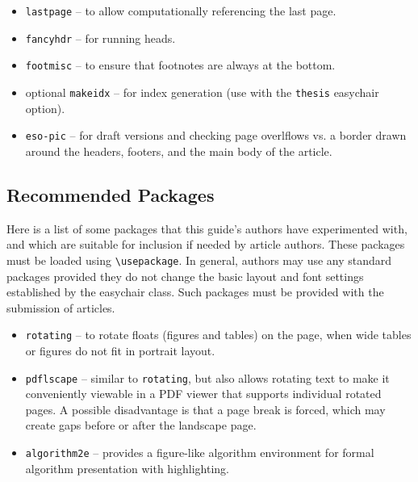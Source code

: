 \documentclass[EPiC]{easychair}
\newcommand{\easychair}{\textsf{easychair}}
\begin{document}
\begin{itemize}
\item
\texttt{lastpage} \cite{lastpage-package} -- to allow computationally
referencing the last page.

\item
\texttt{fancyhdr} \cite{fancyhdr-package} -- for running heads.

\item
\texttt{footmisc} \cite{footmisc-package} -- to ensure that footnotes are
always at the bottom.

\item
optional \texttt{makeidx} \cite{makeidx-package} -- for index generation
(use with the \texttt{thesis} {\easychair} option).

\item
\texttt{eso-pic} \cite{eso-pic-package} -- for draft versions and checking page
overlflows vs. a border drawn around the headers, footers, and the main body of
the article.

\end{itemize}

\subsection{Recommended Packages}
\label{sect:recommended-packages}

Here is a list of some packages that this guide's authors have experimented 
with, and which are suitable for inclusion if needed by article authors.
These packages must be loaded using \verb+\usepackage+.
In general, authors may use any standard packages provided they do not change
the basic layout and font settings established by the {\easychair} class.
Such packages must be provided with the submission of articles.

\begin{itemize}
\item
\texttt{rotating} \cite{rotating-package} -- to rotate floats (figures and
tables) on the page, when wide tables or figures do not fit in portrait layout.

\item
\texttt{pdflscape} \cite{pdflscape-package} -- similar to \texttt{rotating}, 
but also allows rotating text to make it conveniently viewable in a PDF 
viewer that supports individual rotated pages.
A possible disadvantage is that a page break is forced, which may create
gaps before or after the landscape page.

\item
\texttt{algorithm2e} \cite{algorithm2e-package} -- provides a figure-like
algorithm environment for formal algorithm presentation with highlighting.

\end{itemize}
\end{document}
